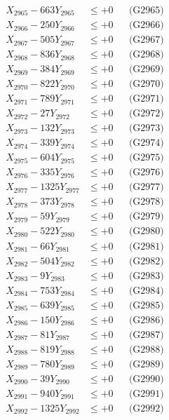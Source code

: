 \documentclass[a4paper,10pt]{article}
\begin{document}
{\begin{align}
X_{2965} - 663Y_{2965} &\leq +0 && \text{(G2965)} \\
X_{2966} - 250Y_{2966} &\leq +0 && \text{(G2966)} \\
X_{2967} - 505Y_{2967} &\leq +0 && \text{(G2967)} \\
X_{2968} - 836Y_{2968} &\leq +0 && \text{(G2968)} \\
X_{2969} - 384Y_{2969} &\leq +0 && \text{(G2969)} \\
X_{2970} - 822Y_{2970} &\leq +0 && \text{(G2970)} \\
\allowbreak
X_{2971} - 789Y_{2971} &\leq +0 && \text{(G2971)} \\
X_{2972} - 27Y_{2972} &\leq +0 && \text{(G2972)} \\
X_{2973} - 132Y_{2973} &\leq +0 && \text{(G2973)} \\
X_{2974} - 339Y_{2974} &\leq +0 && \text{(G2974)} \\
X_{2975} - 604Y_{2975} &\leq +0 && \text{(G2975)} \\
X_{2976} - 335Y_{2976} &\leq +0 && \text{(G2976)} \\
X_{2977} - 1325Y_{2977} &\leq +0 && \text{(G2977)} \\
X_{2978} - 373Y_{2978} &\leq +0 && \text{(G2978)} \\
X_{2979} - 59Y_{2979} &\leq +0 && \text{(G2979)} \\
X_{2980} - 522Y_{2980} &\leq +0 && \text{(G2980)} \\
\allowbreak
X_{2981} - 66Y_{2981} &\leq +0 && \text{(G2981)} \\
X_{2982} - 504Y_{2982} &\leq +0 && \text{(G2982)} \\
X_{2983} - 9Y_{2983} &\leq +0 && \text{(G2983)} \\
X_{2984} - 753Y_{2984} &\leq +0 && \text{(G2984)} \\
X_{2985} - 639Y_{2985} &\leq +0 && \text{(G2985)} \\
X_{2986} - 150Y_{2986} &\leq +0 && \text{(G2986)} \\
X_{2987} - 81Y_{2987} &\leq +0 && \text{(G2987)} \\
X_{2988} - 819Y_{2988} &\leq +0 && \text{(G2988)} \\
X_{2989} - 780Y_{2989} &\leq +0 && \text{(G2989)} \\
X_{2990} - 39Y_{2990} &\leq +0 && \text{(G2990)} \\
\allowbreak
X_{2991} - 940Y_{2991} &\leq +0 && \text{(G2991)} \\
X_{2992} - 1325Y_{2992} &\leq +0 && \text{(G2992)} \\

\end{align}}
\end{document}
